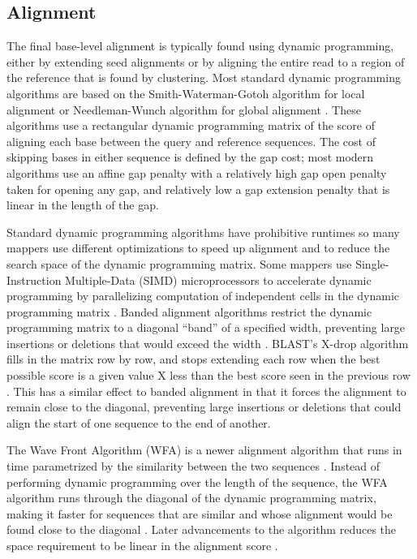 \documentclass[11pt]{ucscthesis}
\begin{document}
\subsection{Alignment}

The final base-level alignment is typically found using dynamic programming, either by extending seed alignments or by aligning the entire read to a region of the reference that is found by clustering.
Most standard dynamic programming algorithms are based on the Smith-Waterman-Gotoh algorithm for local alignment \cite{smith_waterman_1981,gotoh_1982} or Needleman-Wunch algorithm for global alignment \cite{needleman_wunsch_1970}.
These algorithms use a rectangular dynamic programming matrix of the score of aligning each base between the query and reference sequences.
The cost of skipping bases in either sequence is defined by the gap cost; most modern algorithms use an affine gap penalty with a relatively high gap open penalty taken for opening any gap, and relatively low a gap extension penalty that is linear in the length of the gap.

Standard dynamic programming algorithms have prohibitive runtimes so many mappers use different optimizations to speed up alignment and to reduce the search space of the dynamic programming matrix.
Some mappers use Single-Instruction Multiple-Data (SIMD) microprocessors to accelerate dynamic programming by parallelizing computation of independent cells in the dynamic programming matrix \cite{farrar_striped_2007,rognes_six-fold_2000}.
Banded alignment algorithms restrict the dynamic programming matrix to a diagonal ``band'' of a specified width, preventing large insertions or deletions that would exceed the width \cite{chao_aligning_1992}.
BLAST's X-drop algorithm fills in the matrix row by row, and stops extending each row when the best possible score is a given value X less than the best score seen in the previous row \cite{altschul_blast_1990}.
This has a similar effect to banded alignment in that it forces the alignment to remain close to the diagonal, preventing large insertions or deletions that could align the start of one sequence to the end of another.

The Wave Front Algorithm (WFA) is a newer alignment algorithm that runs in time parametrized by the similarity between the two sequences \cite{marco-sola_fast_wfa_2021}.
Instead of performing dynamic programming over the length of the sequence, the WFA algorithm runs through the diagonal of the dynamic programming matrix, making it faster for sequences that are similar and whose alignment would be found close to the diagonal \cite{marco-sola_fast_wfa_2021}.
Later advancements to the algorithm reduces the space requirement to be linear in the alignment score \cite{eizenga_wfa_2022}.
\end{document}
